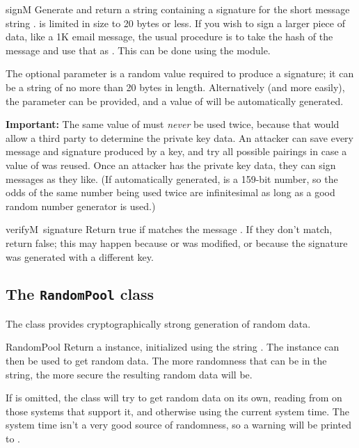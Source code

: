 \begin{funcdesc}{sign}{M  }
Generate and return a string containing a signature for the short
message string .   is limited in size to 20 bytes or
less.  If you wish to sign a larger piece of data, like a 1K email
message, the usual procedure is to take the hash of the message and
use that as .  This can be done using the  module.

The optional parameter  is a random
value required to produce a signature; it can be a string of no more
than 20 bytes in length.  Alternatively (and more easily), the
 parameter can be provided, and a value of  will
be automatically generated.

{\bf Important:} The same value of  must \emph{never} be used
twice, because that would allow a third party to determine the private
key data.  An attacker can save every message and signature produced
by a key, and try all possible pairings in case a value of  was
reused.  Once an attacker has the private key data, they can sign
messages as they like.  (If automatically generated,  is a
159-bit number, so the odds of the same number being used twice are
infinitesimal as long as a good random number generator is used.)
\end{funcdesc}

\begin{funcdesc}{verify}{M\, signature}
Return true if  matches the message .  If they
don't match, return false; this may happen because  or
 was modified, or because the signature was generated
with a different key.
\end{funcdesc}

\subsection{The {\tt RandomPool} class}

The  class provides cryptographically strong
generation of random data.  

\begin{funcdesc}{RandomPool}{}
Return a  instance, initialized using the string
.  The instance can then be used to get random data.  
The more randomness that can be in the  string, the more
secure the resulting random data will be.

If  is omitted, the class will try to get random data on its
own, reading from  on those systems that support
it, and otherwise using the current system time.  The system time
isn't a very good source of randomness, so a warning will be printed
to .
\end{funcdesc}

